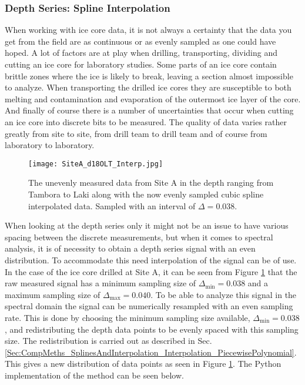 \documentclass[../../CompleteThesis/Complete_1stDraft.tex]{subfiles}
\begin{document}
\subsubsection[Spline Interpolation]{Depth Series: Spline Interpolation}
\label{Subsubsec:Method_FirstSigmaEstimate_BackDiffusion_SplineInterp}
When working with ice core data, it is not always a certainty that the data you get from the field are as continuous or as evenly sampled as one could have hoped. A lot of factors are at play when drilling, transporting, dividing and cutting an ice core for laboratory studies. Some parts of an ice core contain brittle zones where the ice is likely to break, leaving a section almost impossible to analyze. When transporting the drilled ice cores they are susceptible to both melting and contamination and evaporation of the outermost ice layer of the core. And finally of course there is a number of uncertainties that occur when cutting an ice core into discrete bits to be measured. The quality of data varies rather greatly from site to site, from drill team to drill team and of course from laboratory to laboratory. \\
\begin{figure}[h]
	\centering
	\texttt{[image: SiteA\_d18OLT\_Interp.jpg]}
	\caption[Measured and interpolated $\delta^{18}$O data, Site A]{The unevenly measured data from Site A in the depth ranging from Tambora to Laki along with the now evenly sampled cubic spline interpolated data. Sampled with an interval of $\Delta = 0.038$.}
	\label{fig:SiteA_d18OLT_Interp}
\end{figure}
When looking at the depth series only it might not be an issue to have various spacing between the discrete measurements, but when it comes to spectral analysis, it is of necessity to obtain a depth series signal with an even distribution. To accommodate this need interpolation of the signal can be of use. In the case of the ice core drilled at Site A, it can be seen from Figure \ref{fig:SiteA_d18OLT_Interp} that the raw measured signal has a minimum sampling size of $\Delta_{\text{min}}=0.038$ and a maximum sampling size of $\Delta_{\text{max}}=0.040$. To be able to analyze this signal in the spectral domain the signal can be numerically resampled with an even sampling rate. This is done by choosing the minimum sampling size available, $\Delta_{\text{min}}=0.038$, and redistributing the depth data points to be evenly spaced with this sampling size. The redistribution is carried out as described in Sec. \ref{Sec:CompMeths_SplinesAndInterpolation_Interpolation_PiecewisePolynomial}.
This gives a new distribution of data points as seen in Figure \ref{fig:SiteA_d18OLT_Interp}. The Python implementation of the method can be seen below.
\end{document}
